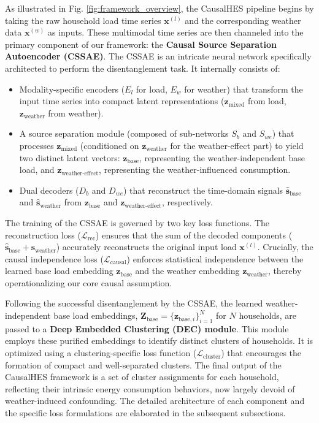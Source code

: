 \documentclass[journal]{IEEEtran}
\begin{document}
As illustrated in Fig. \ref{fig:framework_overview}, the CausalHES pipeline begins by taking the raw household load time series $\mathbf{x}^{(l)}$ and the corresponding weather data $\mathbf{x}^{(w)}$ as inputs. These multimodal time series are then channeled into the primary component of our framework: the \textbf{Causal Source Separation Autoencoder (CSSAE)}. The CSSAE is an intricate neural network specifically architected to perform the disentanglement task. It internally consists of:
\begin{itemize}
    \item Modality-specific encoders ($E_l$ for load, $E_w$ for weather) that transform the input time series into compact latent representations ($\mathbf{z}_{\text{mixed}}$ from load, $\mathbf{z}_{\text{weather}}$ from weather).
    \item A source separation module (composed of sub-networks $S_b$ and $S_{we}$) that processes $\mathbf{z}_{\text{mixed}}$ (conditioned on $\mathbf{z}_{\text{weather}}$ for the weather-effect part) to yield two distinct latent vectors: $\mathbf{z}_{\text{base}}$, representing the weather-independent base load, and $\mathbf{z}_{\text{weather-effect}}$, representing the weather-influenced consumption.
    \item Dual decoders ($D_b$ and $D_{we}$) that reconstruct the time-domain signals $\hat{\mathbf{s}}_{\text{base}}$ and $\hat{\mathbf{s}}_{\text{weather}}$ from $\mathbf{z}_{\text{base}}$ and $\mathbf{z}_{\text{weather-effect}}$, respectively.
\end{itemize}
The training of the CSSAE is governed by two key loss functions. The reconstruction loss ($\mathcal{L}_{\text{rec}}$) ensures that the sum of the decoded components ($\hat{\mathbf{s}}_{\text{base}} + \hat{\mathbf{s}}_{\text{weather}}$) accurately reconstructs the original input load $\mathbf{x}^{(l)}$. Crucially, the causal independence loss ($\mathcal{L}_{\text{causal}}$) enforces statistical independence between the learned base load embedding $\mathbf{z}_{\text{base}}$ and the weather embedding $\mathbf{z}_{\text{weather}}$, thereby operationalizing our core causal assumption.

Following the successful disentanglement by the CSSAE, the learned weather-independent base load embeddings, $\mathbf{Z}_{\text{base}} = \{\mathbf{z}_{\text{base},i}\}_{i=1}^N$ for $N$ households, are passed to a \textbf{Deep Embedded Clustering (DEC) module}. This module employs these purified embeddings to identify distinct clusters of households. It is optimized using a clustering-specific loss function ($\mathcal{L}_{\text{cluster}}$) that encourages the formation of compact and well-separated clusters. The final output of the CausalHES framework is a set of cluster assignments for each household, reflecting their intrinsic energy consumption behaviors, now largely devoid of weather-induced confounding. The detailed architecture of each component and the specific loss formulations are elaborated in the subsequent subsections.
\end{document}
